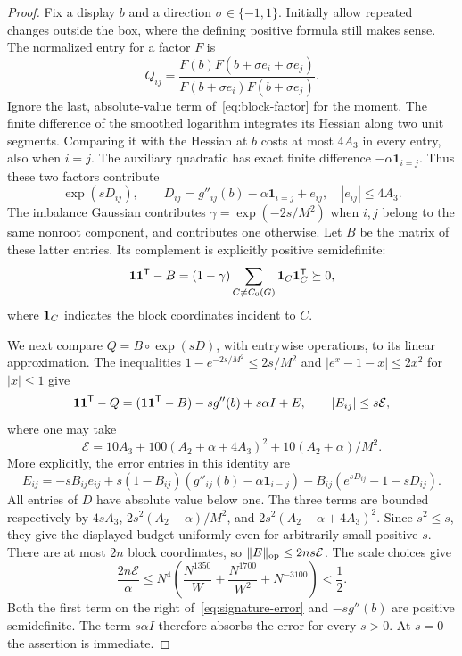 \begin{proof}
Fix a display $b$ and a direction $\sigma\in\{-1,1\}$. Initially allow
repeated changes outside the box, where the defining positive formula
still makes sense. The normalized entry for a factor $F$ is
\[
 Q_{ij}=\frac{F(b)F(b+\sigma e_i+\sigma e_j)}
                  {F(b+\sigma e_i)F(b+\sigma e_j)}.
\]
Ignore the last, absolute-value term of~\eqref{eq:block-factor} for the
moment. The finite difference of the smoothed logarithm integrates its
Hessian along two unit segments. Comparing it with the Hessian at $b$
costs at most $4A_3$ in every entry, also when $i=j$. The auxiliary
quadratic has exact finite difference $-\alpha\mathbf1_{i=j}$. Thus
these two factors contribute
\[
 \exp(sD_{ij}),\qquad
 D_{ij}=g''_{ij}(b)-\alpha\mathbf1_{i=j}+e_{ij},\quad
 |e_{ij}|\le4A_3.
\]
The imbalance Gaussian contributes
$\gamma=\exp(-2s/M^2)$ when $i,j$ belong to the same nonroot component,
and contributes one otherwise. Let $B$ be the matrix of these latter
entries. Its complement is explicitly positive semidefinite:
\[
 \mathbf 1\mathbf 1^{\mathsf T}-B
   =(1-\gamma)\sum_{C\ne C_0(G)}\mathbf 1_C\mathbf 1_C^{\mathsf T}\succeq0,
\]
where $\mathbf 1_C$ indicates the block coordinates incident to $C$.

We next compare $Q=B\circ\exp(sD)$, with entrywise operations, to its
linear approximation. The inequalities
$1-e^{-2s/M^2}\le2s/M^2$ and
$|e^x-1-x|\le2x^2$ for $|x|\le1$ give
\begin{equation}\label{eq:signature-error}
 \mathbf 1\mathbf 1^{\mathsf T}-Q
  =(\mathbf 1\mathbf 1^{\mathsf T}-B)-s g''(b)+s\alpha I+E,
 \qquad |E_{ij}|\le s\mathcal E,
\end{equation}
where one may take
\[
 \mathcal E=10A_3+100(A_2+\alpha+4A_3)^2
                     +10(A_2+\alpha)/M^2.
\]
More explicitly, the error entries in this identity are
\[
 E_{ij}=-sB_{ij}e_{ij}
       +s(1-B_{ij})(g''_{ij}(b)-\alpha\mathbf1_{i=j})
       -B_{ij}(e^{sD_{ij}}-1-sD_{ij}).
\]
All entries of $D$ have absolute value below one. The three terms
are bounded respectively by $4sA_3$,
$2s^2(A_2+\alpha)/M^2$, and
$2s^2(A_2+\alpha+4A_3)^2$. Since $s^2\le s$, they give the displayed
budget uniformly even for arbitrarily small positive $s$.
There are at most $2n$ block coordinates, so
$\lVert E\rVert_{\rm op}\le2ns\mathcal E$. The scale choices give
\[
 \frac{2n\mathcal E}{\alpha}
 \le N^4\left(\frac{N^{1350}}W+
                 \frac{N^{1700}}{W^2}+N^{-3100}\right)<\frac12.
\]
Both the first term on the right of~\eqref{eq:signature-error} and
$-sg''(b)$ are positive semidefinite. The term $s\alpha I$ therefore
absorbs the error for every $s>0$. At $s=0$ the assertion is immediate.


\end{proof}
